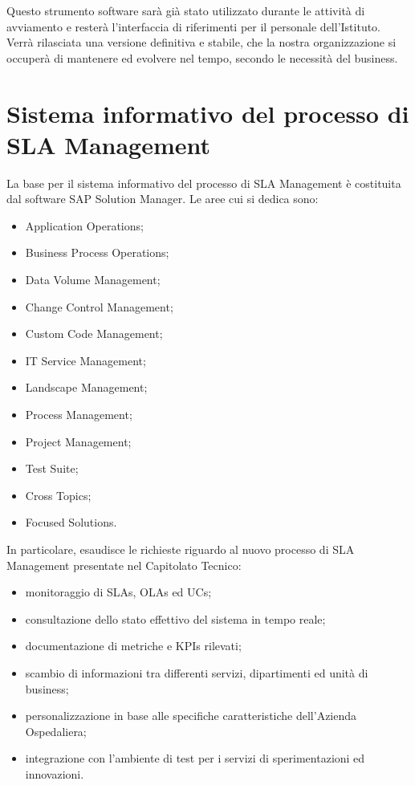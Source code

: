Questo strumento software sarà già stato utilizzato durante le attività di avviamento e resterà l'interfaccia di riferimenti per il personale dell'Istituto. Verrà rilasciata una versione definitiva e stabile, che la nostra organizzazione si occuperà di mantenere ed evolvere nel tempo, secondo le necessità del business.


\section{Sistema informativo del processo di SLA Management}

La base per il sistema informativo del processo di SLA Management è costituita dal software SAP Solution Manager. Le aree cui si dedica sono:

\begin{itemize}
	\item Application Operations;
    \item Business Process Operations;
    \item Data Volume Management;
    \item Change Control Management;
    \item Custom Code Management;
    \item IT Service Management;
    \item Landscape Management;
    \item Process Management;
    \item Project Management;
    \item Test Suite;
    \item Cross Topics;
    \item Focused Solutions.
\end{itemize}

In particolare, esaudisce le richieste riguardo al nuovo processo di SLA Management presentate nel Capitolato Tecnico:

\begin{itemize}
	\item monitoraggio di SLAs, OLAs ed UCs;
    \item consultazione dello stato effettivo del sistema in tempo reale;
    \item documentazione di metriche e KPIs rilevati;
    \item scambio di informazioni tra differenti servizi, dipartimenti ed unità di business;
    \item personalizzazione in base alle specifiche caratteristiche dell'Azienda Ospedaliera;
    \item integrazione con l'ambiente di test per i servizi di sperimentazioni ed innovazioni.
\end{itemize}

